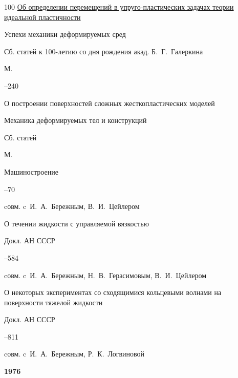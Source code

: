 \begin{thebibliography}{100}
\paper \href{https://zbmath.org/?q=an:0325.73038}{Об определении перемещений в упруго-пластических задачах теории идеальной пластичности}

\inbook Успехи механики деформируемых сред 

\bookinfo Сб. статей к 100-летию со дня рождения акад. Б.~Г.~Галеркина

\publaddr М.


–240





\paper О построении поверхностей сложных жесткопластических моделей 

\inbook Механика деформируемых тел и конструкций

\bookinfo Сб. статей

\publaddr М.

\publ Машиностроение


–70 

\miscnote cовм. c~И.~А.~Бережным, В.~И.~Цейлером






\paper О течении жидкости с управляемой вязкостью 

\jour Докл. АН СССР




–584 

\miscnote cовм. c~И.~А.~Бережным, Н.~В.~Герасимовым, В.~И.~Цейлером




\paper О некоторых экспериментах со сходящимися кольцевыми волнами на поверхности тяжелой жидкости 

\jour Докл. АН СССР




–811 

\miscnote cовм. c~И.~А.~Бережным, Р.~К.~Логвиновой



\item[] \centerline{\bf 1976}




\end{thebibliography}
